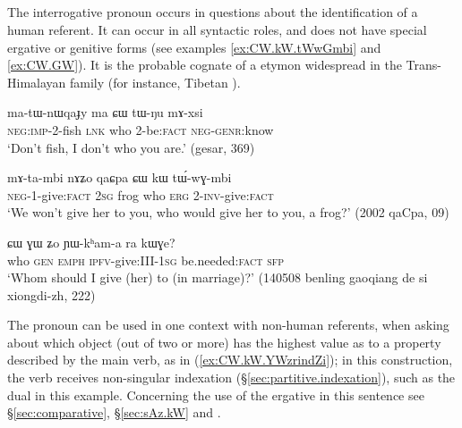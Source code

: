 \subsection{} \label{sec:CW.pronoun}
The interrogative pronoun  occurs in questions about the identification of a human referent. It can occur in all syntactic roles, and does not have special ergative or genitive forms (see examples \ref{ex:CW.kW.tWwGmbi} and \ref{ex:CW.GW}). It is the probable cognate of a etymon widespread in the Trans-Himalayan family (for instance, Tibetan ).

\begin{exe}
\ex  \label{ex:CW.tWNu}
\gll ma-tɯ-nɯqaɟy ma ɕɯ tɯ-ŋu mɤ-xsi \\
\textsc{neg}:\textsc{imp}-2-fish \textsc{lnk} who 2-be:\textsc{fact} \textsc{neg}-\textsc{genr}:know   \\
\glt `Don't fish, I don't who you are.' (gesar, 369)
\end{exe}  

\begin{exe}
\ex  \label{ex:CW.kW.tWwGmbi}
\gll  mɤ-ta-mbi nɤʑo qaɕpa ɕɯ kɯ tɯ́-wɣ-mbi    \\
\textsc{neg}-1-give:\textsc{fact} \textsc{2sg} frog who \textsc{erg} 2-\textsc{inv}-give:\textsc{fact}  \\
\glt `We won't give her to you, who would give her to you, a frog?'   (2002 qaCpa, 09)
\end{exe} 
 
\begin{exe}
\ex  \label{ex:CW.GW}
\gll  ɕɯ ɣɯ ʑo ɲɯ-kʰam-a ra kɯɣe?    \\
who \textsc{gen} \textsc{emph} \textsc{ipfv}-give:III-\textsc{1sg} be.needed:\textsc{fact} \textsc{sfp} \\
\glt `Whom should I give (her) to (in marriage)?' (140508 benling gaoqiang de si xiongdi-zh, 222)
\end{exe}  

The pronoun   can be used in one context with non-human referents, when asking about which object (out of two or more) has the highest value as to a property described by the main verb, as in (\ref{ex:CW.kW.YWzrindZi}); in this construction, the verb receives non-singular indexation (§\ref{sec:partitive.indexation}), such as the dual   in this example. Concerning the use of the ergative  in this sentence see §\ref{sec:comparative}, §\ref{sec:sAz.kW} and \citet{jacques16comparative}.  

